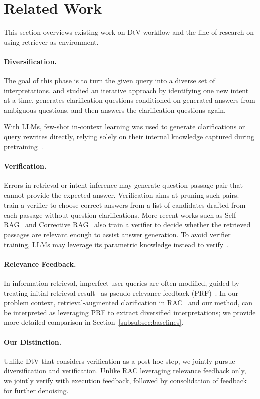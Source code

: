 \section{Related Work}

This section overviews existing work on DtV workflow and the line of research on using retriever as environment. 

\paragraph{Diversification.}
The goal of this phase is to turn the given query into a diverse set of interpretations.
\citet{min-etal-2021-joint} and \citet{sun-etal-2023-answering} studied an iterative approach by identifying one new intent at a time.
\citet{gao-etal-2021-answering} generates clarification questions conditioned on generated answers from ambiguous questions, and then answers the clarification questions again.



With LLMs,
few-shot in-context learning
was used to generate clarifications or query rewrites directly, relying solely on their internal knowledge captured during pretraining~\citep{kim-etal-2023-tree, ma-etal-2023-query}.

\paragraph{Verification.}
Errors in retrieval or intent inference may generate question-passage pair that cannot provide the expected answer.
Verification aims at pruning such pairs.
\citet{shao-huang-2022-answering} train a verifier to choose correct answers from a list of candidates drafted from each passage without question clarifications.
More recent works such as 
Self-RAG~\citep{asai-etal-2024-self-iclr} and Corrective RAG~\citep{yan-etal-2024-corrective} also train a verifier to decide whether the retrieved passages are relevant enough to assist answer generation.
To avoid verifier training, LLMs may leverage its parametric knowledge instead to verify~\citep{li-etal-2024-llatrieval}.

\paragraph{Relevance Feedback.}
In information retrieval, 
imperfect user queries are often modified, guided by treating
initial retrieval result~\citep{rocchio71relevance}
as pseudo relevance feedback (PRF)~\citep{efthimiadis-biron-1993-ucla-trec,evans-lefferts-1993-design-trec,buckley-etal-1994-automatic-trec}.
In our problem context, retrieval-augmented clarification in RAC~\citep{kim-etal-2023-tree} and our method, can be interpreted as leveraging PRF to extract diversified interpretations;
we provide more detailed comparison in Section~\ref{subsubsec:baselines}.


\paragraph{Our Distinction.} 

Unlike DtV that considers verification as a post-hoc step,
we jointly pursue diversification and verification.
Unlike RAC leveraging relevance feedback only,
we jointly verify with execution feedback,
followed by consolidation of feedback for further denoising.


